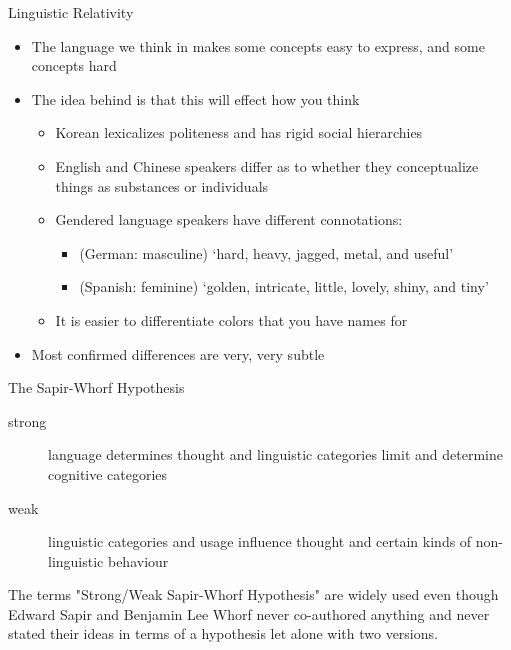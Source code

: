 \begin{frame}{Linguistic Relativity}

\begin{itemize}
\item The language we think in makes some concepts easy to express,
  and some concepts hard
\item The idea behind  is that this will
  effect how you think
  \begin{itemize}
  \item Korean lexicalizes politeness and has rigid social hierarchies
  \item English and Chinese speakers differ as to whether they
    conceptualize things as substances or individuals
  \item Gendered language speakers have different connotations: 
    \begin{itemize}
    \item (German: masculine) `hard, heavy, jagged, metal, and useful'
    \item (Spanish: feminine)  `golden, intricate, little, lovely, shiny, and tiny'
    \end{itemize}
  \item It is easier to differentiate colors that you have names for
  \end{itemize}
\item Most confirmed differences are very, very subtle
\end{itemize}


\end{frame}

\begin{frame}{The Sapir-Whorf Hypothesis}

\begin{description}
\item[strong]  language determines thought and  linguistic categories limit and determine cognitive categories
\item[weak]  linguistic categories and usage influence thought and certain kinds of non-linguistic behaviour
\end{description}

The terms "Strong/Weak Sapir-Whorf Hypothesis" are widely used even though Edward
Sapir and Benjamin Lee Whorf never co-authored anything and never
stated their ideas in terms of a hypothesis let alone with two versions.

\end{frame}

